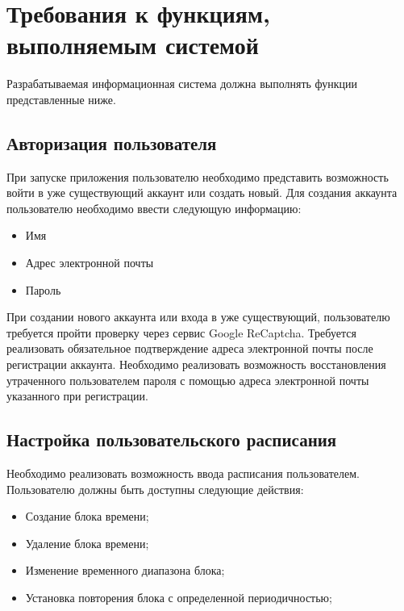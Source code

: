 \documentclass[14pt]{extreport}
\begin{document}
            

        \section{Требования к функциям, выполняемым системой}

            Разрабатываемая информационная система должна выполнять функции представленные ниже. 
            \subsection{Авторизация пользователя}
                При запуске приложения пользователю необходимо представить возможность войти в уже существующий аккаунт или создать новый. Для создания аккаунта пользователю необходимо ввести следующую информацию:

                \begin{itemize}
                    \item Имя 
                    \item Адрес электронной почты 
                    \item Пароль 
                \end{itemize}

                При создании нового аккаунта или входа в уже существующий, пользователю требуется пройти проверку через сервис Google ReCaptcha. Требуется реализовать обязательное подтверждение адреса электронной почты после регистрации аккаунта. Необходимо реализовать возможность восстановления утраченного пользователем пароля с помощью адреса электронной почты указанного при регистрации. 

            
            \subsection{Настройка пользовательского расписания}

                Необходимо реализовать возможность ввода расписания пользователем. Пользователю должны быть доступны следующие действия: 
                \begin{itemize}
                    \item Создание блока времени;
                    \item Удаление блока времени;
                    \item Изменение временного диапазона блока;
                    \item Установка повторения блока с определенной периодичностью;
                \end{itemize}
\end{document}
